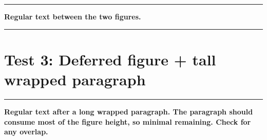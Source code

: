 \documentclass[a4paper,11pt]{article}
\begin{document}
\vspace{4cm}

\begin{swarmwrap}%
  \begin{minipage}[t]{3cm}
    \centering
    \color{blue}\rule{\linewidth}{5cm}
  \end{minipage}%
\end{swarmwrap}%
\swarmwrapnext
\lipsum[1]

{\bfseries\color{orange} Regular text between the two figures.}

\begin{swarmwrap}%
  \begin{minipage}[t]{3cm}
    \centering
    \color{blue}\rule{\linewidth}{5cm}
  \end{minipage}%
\end{swarmwrap}%
\swarmwrapnext
\lipsum[2]

\newpage
\section*{Test 3: Deferred figure + tall wrapped paragraph}

\vspace{4cm}

\begin{swarmwrap}%
  \begin{minipage}[t]{3cm}
    \centering
    \color{red}\rule{\linewidth}{4cm}
  \end{minipage}%
\end{swarmwrap}%
\swarmwrapnext
\lipsum[1-3]

{\bfseries\color{green!50!black} Regular text after a long wrapped paragraph.
The paragraph should consume most of the figure height, so minimal remaining.
Check for any overlap.}

\lipsum[4]
\end{document}

